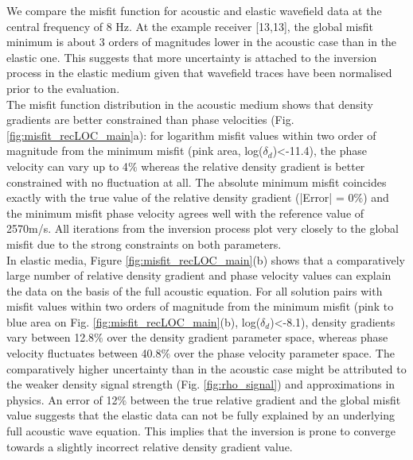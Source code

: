\documentclass[]{article}
\begin{document}
	 We compare the misfit function for acoustic and elastic wavefield data at the central frequency of 8 Hz. At the example receiver [13,13], the global misfit minimum is about 3 orders of magnitudes lower in the acoustic case than in the elastic one. This suggests that more uncertainty is attached to the inversion process in the elastic medium given that wavefield traces have been normalised prior to the evaluation.\\
	 
	 The misfit function distribution in the acoustic medium shows that density gradients are better constrained than phase velocities (Fig. \ref{fig:misfit_recLOC_main}a): for logarithm misfit values within two order of magnitude from the minimum misfit (pink area, log($\delta_{d}$)<-11.4), the phase velocity can vary up to 4$\%$ whereas the relative density gradient is better constrained with no fluctuation at all. The absolute minimum misfit coincides exactly with the true value of the relative density gradient (|Error| = 0$\%$) and the minimum misfit phase velocity agrees well with the reference value of 2570m/s. All iterations from the inversion process plot very closely to the global misfit due to the strong constraints on both parameters.  \\
	 
	 In elastic media, Figure \ref{fig:misfit_recLOC_main}(b) shows that a comparatively large number of relative density gradient and phase velocity values can explain the data on the basis of the full acoustic equation. For all solution pairs with misfit values within two orders of magnitude from the minimum misfit (pink to blue area on Fig. \ref{fig:misfit_recLOC_main}(b), log($\delta_{d}$)<-8.1), density gradients vary between 12.8$\%$ over the density gradient parameter space, whereas phase velocity fluctuates between 40.8$\%$ over the phase velocity parameter space. The comparatively higher uncertainty than in the acoustic case might be attributed to the weaker density signal strength (Fig. \ref{fig:rho_signal}) and approximations in physics. An error of 12$\%$ between the true relative gradient and the global misfit value suggests that the elastic data can not be fully explained by an underlying full acoustic wave equation. This implies that the inversion is prone to converge towards a slightly incorrect relative density gradient value.
	 
\end{document}

